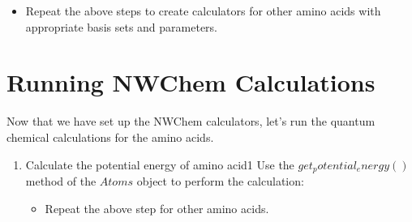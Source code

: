 \documentclass[letterpaper,10pt,english]{sphinxmanual}
\begin{document}
\begin{enumerate}
\begin{quote}
\begin{sphinxVerbatim}[commandchars=\\\{\}]
\end{sphinxVerbatim}
\end{quote}
\begin{itemize}
\item {} 
\sphinxAtStartPar
Repeat the above steps to create calculators for other amino acids with appropriate basis sets and parameters.

\end{itemize}

\end{enumerate}


\section{Running NWChem Calculations}
\label{\detokenize{nwase/nwase:running-nwchem-calculations}}
\sphinxAtStartPar
Now that we have set up the NWChem calculators, let’s run the quantum chemical calculations for the amino acids.
\begin{enumerate}
%
\item {} 
\sphinxAtStartPar
Calculate the potential energy of amino acid1
\sphinxhyphen{} Use the \(get_potential_energy()\) method of the \(Atoms\) object to perform the calculation:
\begin{quote}

\begin{sphinxVerbatim}[commandchars=\\\{\}]
  
  
\end{sphinxVerbatim}
\end{quote}
\begin{itemize}
\item {} 
\sphinxAtStartPar
Repeat the above step for other amino acids.

\end{itemize}

\end{enumerate}
\end{document}
